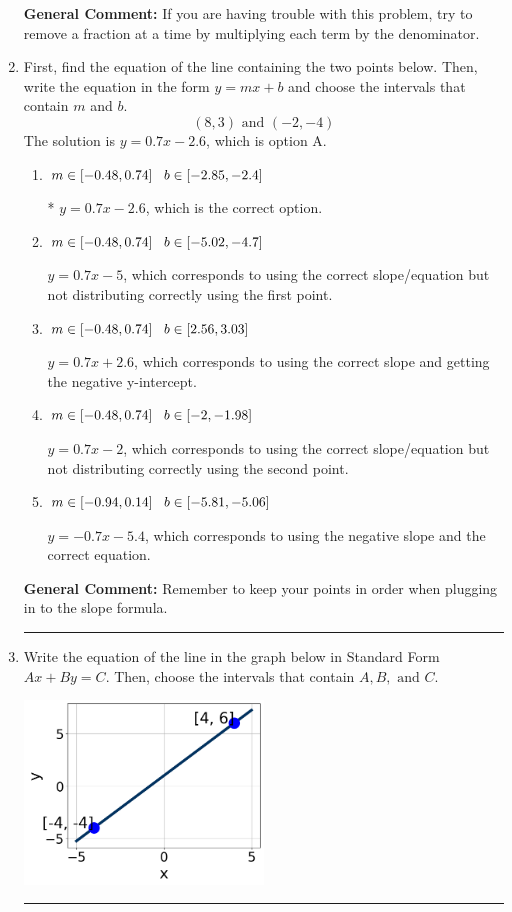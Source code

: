 \documentclass{extbook}[14pt]
\newcommand{\litem}[1]{\item #1

\rule{\textwidth}{0.4pt}}
\begin{document}
\begin{enumerate}
{\textbf{General Comment:} If you are having trouble with this problem, try to remove a fraction at a time by multiplying each term by the denominator.
}
\litem{
First, find the equation of the line containing the two points below. Then, write the equation in the form $ y=mx+b $ and choose the intervals that contain $m$ and $b$.
\[ (8, 3) \text{ and } (-2, -4) \]The solution is \( y = 0.7x -2.6 \), which is option A.\begin{enumerate}[label=\Alph*.]
\item \( m \in [-0.48, 0.74] \hspace*{3mm} b \in [-2.85, -2.4] \)

* $y = 0.7x -2.6$, which is the correct option.
\item \( m \in [-0.48, 0.74] \hspace*{3mm} b \in [-5.02, -4.7] \)

 $y = 0.7x -5$, which corresponds to using the correct slope/equation but not distributing correctly using the first point.
\item \( m \in [-0.48, 0.74] \hspace*{3mm} b \in [2.56, 3.03] \)

 $y = 0.7x + 2.6$, which corresponds to using the correct slope and getting the negative y-intercept.
\item \( m \in [-0.48, 0.74] \hspace*{3mm} b \in [-2, -1.98] \)

 $y = 0.7x -2$, which corresponds to using the correct slope/equation but not distributing correctly using the second point.
\item \( m \in [-0.94, 0.14] \hspace*{3mm} b \in [-5.81, -5.06] \)

 $y = -0.7x -5.4$, which corresponds to using the negative slope and the correct equation.
\end{enumerate}

\textbf{General Comment:} Remember to keep your points in order when plugging in to the slope formula.
}
\litem{
Write the equation of the line in the graph below in Standard Form $Ax+By=C$. Then, choose the intervals that contain $A, B, \text{ and } C$.

\begin{center}
    \includegraphics[width=0.5\textwidth]{../Figures/linearGraphToStandardA.png}
\end{center}


}
\end{enumerate}
\end{document}
